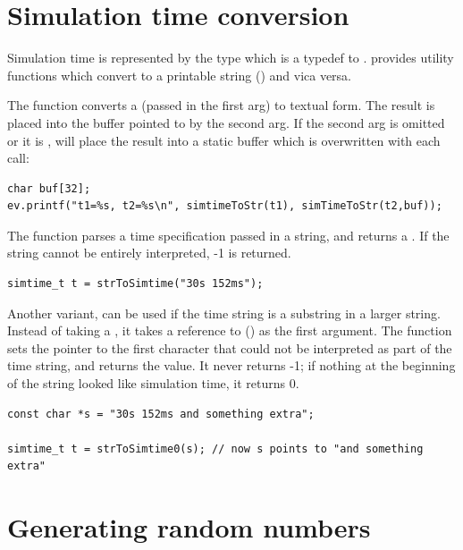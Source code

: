 

\section{Simulation time conversion}

Simulation time is represented by the type 
which is a typedef to .
{\opp} provides utility functions which convert 
to a printable string () and vica versa.

The  function converts a 
(passed in the first arg) to textual form. The result is placed into
the buffer pointed to by the second arg. If the second arg is omitted
or it is ,  will place the result into a
static buffer which is overwritten with each call:

\begin{verbatim}
char buf[32];
ev.printf("t1=%s, t2=%s\n", simtimeToStr(t1), simTimeToStr(t2,buf));
\end{verbatim}

The  function parses a time specification passed
in a string, and returns a . If the string cannot
be entirely interpreted, -1 is returned.

\begin{verbatim}
simtime_t t = strToSimtime("30s 152ms");
\end{verbatim}

Another variant,  can be used if the time
string is a substring in a larger string. Instead of taking a ,
it takes a reference to  () as the first argument.  The
function sets the pointer to the first character that could not be
interpreted as part of the time string, and returns the value. It
never returns -1; if nothing at the beginning of the string looked
like simulation time, it returns 0.

\begin{verbatim}
const char *s = "30s 152ms and something extra";

simtime_t t = strToSimtime0(s); // now s points to "and something extra"
\end{verbatim}


\section{Generating random numbers}

